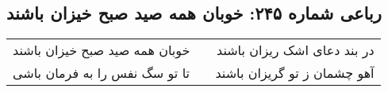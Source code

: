 \begin{center}
\section*{رباعی شماره ۲۴۵: خوبان همه صید صبح خیزان باشند}
\label{sec:sh245}
\begin{longtable}{l p{0.5cm} r}
خوبان همه صید صبح خیزان باشند
&&
در بند دعای اشک ریزان باشند
\\
تا تو سگ نفس را به فرمان باشی
&&
آهو چشمان ز تو گریزان باشند
\\
\end{longtable}
\end{center}
